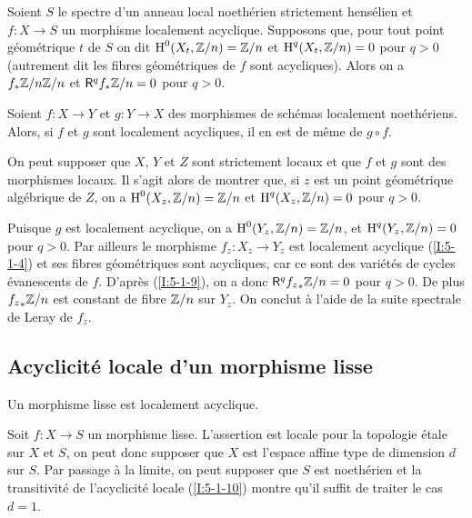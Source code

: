 \documentclass[oneside]{book}
\begin{document}
\begin{corollary}\label{I:5-1-9}
Soient $S$ le spectre d'un anneau local noethérien strictement hensélien et 
$f:X\to S$ un morphisme localement acyclique. Supposons que, pour tout point 
géométrique $t$ de $S$ on dit $\operatorname{H}^0(X_t,\mathbb{Z}/n) = \mathbb{Z}/n$ et 
$\operatorname{H}^q(X_t,\mathbb{Z}/n) = 0$ pour $q>0$ (autrement dit les fibres géométriques de 
$f$ sont acycliques). Alors on a $f_* \mathbb{Z}/n\mathbb{Z}/n$ et $\mathsf{R}^qf_*\mathbb{Z}/n = 0$ pour 
$q>0$. 
\end{corollary}





\begin{corollary}\label{I:5-1-10}
Soient $f:X\to Y$ et $g:Y\to X$ des morphismes de schémas localement 
noethériens. Alors, si $f$ et $g$ sont localement acycliques, il en est de 
même de $g\circ f$. 
\end{corollary}

On peut supposer que $X$, $Y$ et $Z$ sont strictement locaux et que $f$ et $g$ 
sont des morphismes locaux. Il s'agit alors de montrer que, si $z$ est un point 
géométrique algébrique de $Z$, on a $\operatorname{H}^0(X_z,\mathbb{Z}/n) = \mathbb{Z}/n$ et 
$\operatorname{H}^q(X_z,\mathbb{Z}/n) = 0$ pour $q>0$. 

Puisque $g$ est localement acyclique, on a $\operatorname{H}^0(Y_z,\mathbb{Z}/n) = \mathbb{Z}/n$, et 
$\operatorname{H}^q(Y_z,\mathbb{Z}/n) = 0$ pour $q>0$. Par ailleurs le morphisme $f_z:X_z\to Y_z$ est 
localement acyclique (\ref{I:5-1-4}) et ses fibres géométriques sont 
acycliques, car ce sont des variétés de cycles évanescents de $f$. 
D'après (\ref{I:5-1-9}), on a donc $\mathsf{R}^q {f_z}_*\mathbb{Z}/n = 0$ pour $q>0$. De plus 
${f_z}_*\mathbb{Z}/n$ est constant de fibre $\mathbb{Z}/n$ sur $Y_z$. On conclut à l'aide de 
la suite spectrale de Leray de $f_z$. 










\subsection{Acyclicité locale d'un morphisme lisse}\label{I:5-2}





\begin{theorem}\label{I:5-2-1}
Un morphisme lisse est localement acyclique.
\end{theorem}

Soit $f:X\to S$ un morphisme lisse. L'assertion est locale pour la topologie 
étale sur $X$ et $S$, on peut donc supposer que $X$ est l'espace affine type 
de dimension $d$ sur $S$. Par passage à la limite, on peut supposer que $S$ 
est noethérien et la transitivité de l'acyclicité locale (\ref{I:5-1-10}) montre 
qu'il suffit de traiter le cas $d=1$. 
\end{document}
